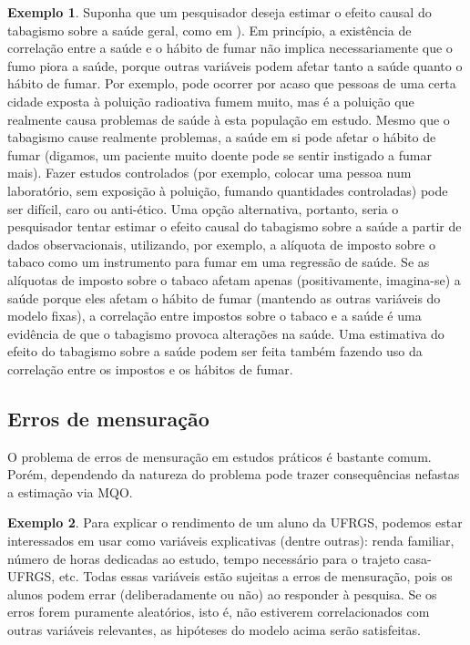 \documentclass[
]{book}
\theoremstyle{definition}
\theoremstyle{definition}
\newtheorem{example}{Exemplo}[chapter]
\theoremstyle{definition}
\theoremstyle{remark}
\begin{document}
\begin{example}
\protect\hypertarget{exm:tabaco}{}{\label{exm:tabaco} }Suponha que um pesquisador deseja estimar o efeito causal do tabagismo sobre a saúde geral, como em \citet{leigh2004} ). Em princípio, a existência de correlação entre a saúde e o hábito de fumar não implica necessariamente que o fumo piora a saúde, porque outras variáveis podem afetar tanto a saúde quanto o hábito de fumar. Por exemplo, pode ocorrer por acaso que pessoas de uma certa cidade exposta à poluição radioativa fumem muito, mas é a poluição que realmente causa problemas de saúde à esta população em estudo. Mesmo que o tabagismo cause realmente problemas, a saúde em si pode afetar o hábito de fumar (digamos, um paciente muito doente pode se sentir instigado a fumar mais). Fazer estudos controlados (por exemplo, colocar uma pessoa num laboratório, sem exposição à poluição, fumando quantidades controladas) pode ser difícil, caro ou anti-ético. Uma opção alternativa, portanto, seria o pesquisador tentar estimar o efeito causal do tabagismo sobre a saúde a partir de dados observacionais, utilizando, por exemplo, a alíquota de imposto sobre o tabaco como um instrumento para fumar em uma regressão de saúde. Se as alíquotas de imposto sobre o tabaco afetam apenas (positivamente, imagina-se) a saúde porque eles afetam o hábito de fumar (mantendo as outras variáveis do modelo fixas), a correlação entre impostos sobre o tabaco e a saúde é uma evidência de que o tabagismo provoca alterações na saúde. Uma estimativa do efeito do tabagismo sobre a saúde podem ser feita também fazendo uso da correlação entre os impostos e os hábitos de fumar.
\end{example}

\hypertarget{erros-de-mensurauxe7uxe3o}{%
\subsection{Erros de mensuração}\label{erros-de-mensurauxe7uxe3o}}

O problema de erros de mensuração em estudos práticos é bastante comum. Porém, dependendo da natureza do problema pode trazer consequências nefastas a estimação via MQO.

\begin{example}
\protect\hypertarget{exm:alunosufrgs}{}{\label{exm:alunosufrgs} } Para explicar o rendimento de um aluno da UFRGS, podemos estar interessados em usar como variáveis explicativas (dentre outras): renda familiar, número de horas dedicadas ao estudo, tempo necessário para o trajeto casa-UFRGS, etc. Todas essas variáveis estão sujeitas a erros de mensuração, pois os alunos podem errar (deliberadamente ou não) ao responder à pesquisa. Se os erros forem puramente aleatórios, isto é, não estiverem correlacionados com outras variáveis relevantes, as hipóteses do modelo acima serão satisfeitas.
\end{example}
\end{document}
